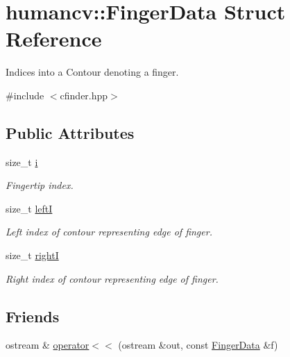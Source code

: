 \hypertarget{structhumancv_1_1_finger_data}{\section{humancv\-:\-:Finger\-Data Struct Reference}
\label{structhumancv_1_1_finger_data}
}


Indices into a {\ttfamily Contour} denoting a finger.  




{\ttfamily \#include $<$cfinder.\-hpp$>$}

\subsection*{Public Attributes}
\begin{DoxyCompactItemize}
\item 
size\-\_\-t \hyperlink{structhumancv_1_1_finger_data_a5cc8c5081bfdc0ab8ffe83051fa6f966}{i}
\begin{DoxyCompactList}\small\item\em Fingertip index. \end{DoxyCompactList}\item 
size\-\_\-t \hyperlink{structhumancv_1_1_finger_data_a71ae77ff3ac0e1ebbcf635d942eaa81e}{left\-I}
\begin{DoxyCompactList}\small\item\em Left index of contour representing edge of finger. \end{DoxyCompactList}\item 
size\-\_\-t \hyperlink{structhumancv_1_1_finger_data_a00ef4dc86d46d741a289e61dcf396bb3}{right\-I}
\begin{DoxyCompactList}\small\item\em Right index of contour representing edge of finger. \end{DoxyCompactList}\end{DoxyCompactItemize}
\subsection*{Friends}
\begin{DoxyCompactItemize}
\item 
ostream \& \hyperlink{structhumancv_1_1_finger_data_a6341d1d30d8b360b043084bd59b601ea}{operator$<$$<$} (ostream \&out, const \hyperlink{structhumancv_1_1_finger_data}{Finger\-Data} \&f)
\end{DoxyCompactItemize}


